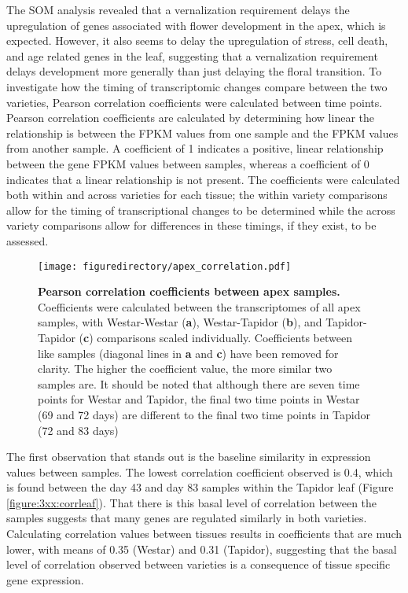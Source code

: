 \documentclass[12pt,]{book}
\begin{document}
The SOM analysis revealed that a vernalization requirement delays the
upregulation of genes associated with flower development in the apex,
which is expected. However, it also seems to delay the upregulation of
stress, cell death, and age related genes in the leaf, suggesting that a
vernalization requirement delays development more generally than just
delaying the floral transition. To investigate how the timing of
transcriptomic changes compare between the two varieties, Pearson
correlation coefficients were calculated between time points. Pearson
correlation coefficients are calculated by determining how linear the
relationship is between the FPKM values from one sample and the FPKM
values from another sample. A coefficient of 1 indicates a positive,
linear relationship between the gene FPKM values between samples,
whereas a coefficient of 0 indicates that a linear relationship is not
present. The coefficients were calculated both within and across
varieties for each tissue; the within variety comparisons allow for the
timing of transcriptional changes to be determined while the across
variety comparisons allow for differences in these timings, if they
exist, to be assessed.

\begin{figure}[htbp]
\centering
\texttt{[image: figuredirectory/apex\_correlation.pdf]}
\caption{\textbf{Pearson correlation coefficients between apex samples.}
Coefficients were calculated between the transcriptomes of all apex
samples, with Westar-Westar (\textbf{a}), Westar-Tapidor (\textbf{b}),
and Tapidor-Tapidor (\textbf{c}) comparisons scaled individually.
Coefficients between like samples (diagonal lines in \textbf{a} and
\textbf{c}) have been removed for clarity. The higher the coefficient
value, the more similar two samples are. It should be noted that
although there are seven time points for Westar and Tapidor, the final
two time points in Westar (69 and 72 days) are different to the final
two time points in Tapidor (72 and 83 days)}\label{figure:3xx:corrapex}
\end{figure}

The first observation that stands out is the baseline similarity in
expression values between samples. The lowest correlation coefficient
observed is 0.4, which is found between the day 43 and day 83 samples
within the Tapidor leaf (Figure \ref{figure:3xx:corrleaf}). That there
is this basal level of correlation between the samples suggests that
many genes are regulated similarly in both varieties. Calculating
correlation values between tissues results in coefficients that are much
lower, with means of 0.35 (Westar) and 0.31 (Tapidor), suggesting that
the basal level of correlation observed between varieties is a
consequence of tissue specific gene expression.
\end{document}
